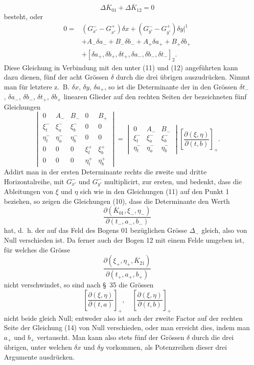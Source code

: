 \documentclass[11pt,a4paper,leqno]{article}
\begin{document}
\[
\Delta\overline K_{01}+\Delta\overline K_{12}=0
\]
besteht, oder
\begin{equation}\tag{13}
\begin{aligned}
0={}&(G_{x'}^- -G_{x'}^+)\delta x+(G_{y'}^- -G_{y'}^+)\delta y\bigg|^1 \\
&+A_-\delta a_-+B_-\delta b_-+A_+\delta a_+ +B_+\delta b_+ \\
&+[\delta a_+,\delta b_+,\delta t_+,\delta a_-,\delta b_-,\delta t_-]_2.
\end{aligned}
\end{equation}
Diese Gleichung in Verbindung mit den unter (11) und (12) angeführten kann dazu dienen, fünf der acht Grössen $\delta$ durch die drei übrigen auszudrücken. Nimmt man für letztere z.~B. $\delta x$, $\delta y$, $\delta a_+$, so ist die Determinante der in den Grössen $\delta t_-$, $\delta a_-$, $\delta b_-$, $\delta t_+$, $\delta b_+$ linearen Glieder auf den rechten Seiten der bezeichneten fünf Gleichungen
\begin{equation}\tag{14}
\begin{vmatrix}
0&A_-&B_-&0&B_+\\
\xi_t^-&\xi_a^-&\xi_b^-&0&0\\
\eta_t^-&\eta_a^-&\eta_b^-&0&0\\
0&0&0&\xi_t^+&\xi_b^+\\
0&0&0&\eta_t^+&\eta_b^+
\end{vmatrix}
=
\begin{vmatrix}
0&A_-&B_-\\
\xi_t^-&\xi_a^-&\xi_b^-\\
\eta_t^-&\eta_a^-&\eta_b^-
\end{vmatrix}
\left[\frac{\partial(\xi,\eta)}{\partial(t,b)}\right]_+ .
\end{equation}
Addirt man in der ersten Determinante rechts die zweite und dritte Horizontalreihe, mit $G_{x'}^-$ und $G_{y'}^-$ multiplicirt, zur ersten, und bedenkt, dass die Ableitungen von $\xi$ und $\eta$ sich wie in den Gleichungen (11) auf den Punkt 1 beziehen, so zeigen die Gleichungen (10), dass die Determinante den Werth
\[
\frac{\partial(\overline K_{01},\xi_-,\eta_-)}{\partial(t_-,a_-,b_-)}
\]
hat, d.~h. der auf das Feld des Bogens 01 bezüglichen Grösse $\Delta_-$ gleich, also von Null verschieden ist. Da ferner auch der Bogen 12 mit einem Felde umgeben ist, für welches die Grösse
\[
\frac{\partial(\xi_+,\eta_+,\overline K_{21})}{\partial(t_+,a_+,b_+)}
\]
nicht verschwindet, so sind nach \S~35 die Grössen
\[
\left[\frac{\partial(\xi,\eta)}{\partial(t,a)}\right]_+,
\quad
\left[\frac{\partial(\xi,\eta)}{\partial(t,b)}\right]_+
\]
nicht beide gleich Null; entweder also ist auch der zweite Factor auf der rechten Seite der Gleichung (14) von Null verschieden, oder man erreicht dies, indem man $a_+$ und $b_+$ vertauscht. Man kann also stets fünf der Grössen $\delta$ durch die drei übrigen, unter welchen $\delta x$ und $\delta y$ vorkommen, als Potenzreihen dieser drei Argumente ausdrücken.
\end{document}
